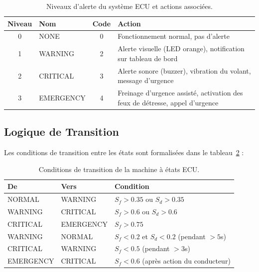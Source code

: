 \begin{table}[H]
\centering
\caption{Niveaux d'alerte du système ECU et actions associées.}
\label{tab:alert_levels}
\renewcommand{\arraystretch}{1.4}
\begin{tabularx}{\textwidth}{|c|l|c|X|}
\hline
\rowcolor{stellantisblue!15}
\textbf{Niveau} & \textbf{Nom} & \textbf{Code} & \textbf{Action} \\
\hline
\cellcolor{green!20} 0 & NONE & 0 & Fonctionnement normal, pas d'alerte \\
\hline
\cellcolor{alertyellow!30} 1 & WARNING & 2 & Alerte visuelle (LED orange), notification sur tableau de bord \\
\hline
\cellcolor{alertorange!30} 2 & CRITICAL & 3 & Alerte sonore (buzzer), vibration du volant, message d'urgence \\
\hline
\cellcolor{alertred!30} 3 & EMERGENCY & 4 & Freinage d'urgence assisté, activation des feux de détresse, appel d'urgence \\
\hline
\end{tabularx}
\end{table}

\subsection{Logique de Transition}

Les conditions de transition entre les états sont formalisées dans le tableau~\ref{tab:transitions} :

\begin{table}[H]
\centering
\caption{Conditions de transition de la machine à états ECU.}
\label{tab:transitions}
\renewcommand{\arraystretch}{1.3}
\begin{tabularx}{\textwidth}{|l|l|X|}
\hline
\rowcolor{stellantisblue!15}
\textbf{De} & \textbf{Vers} & \textbf{Condition} \\
\hline
NORMAL & WARNING & $S_f > 0.35$ ou $S_d > 0.35$ \\
\hline
WARNING & CRITICAL & $S_f > 0.6$ ou $S_d > 0.6$ \\
\hline
CRITICAL & EMERGENCY & $S_f > 0.75$ \\
\hline
WARNING & NORMAL & $S_f < 0.2$ et $S_d < 0.2$ (pendant $> 5$s) \\
\hline
CRITICAL & WARNING & $S_f < 0.5$ (pendant $> 3$s) \\
\hline
EMERGENCY & CRITICAL & $S_f < 0.6$ (après action du conducteur) \\
\hline
\end{tabularx}
\end{table}

